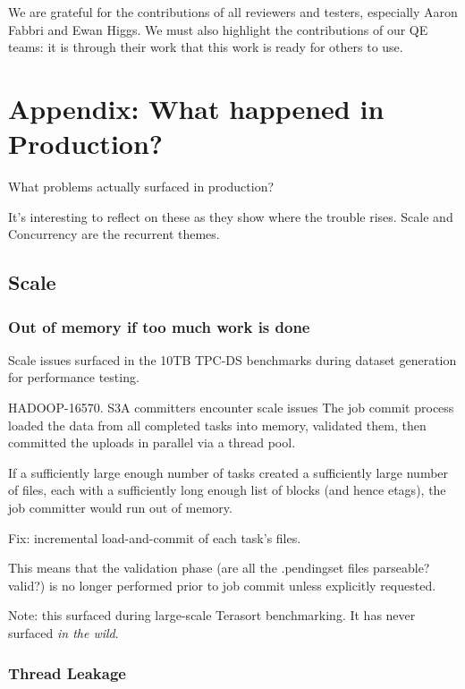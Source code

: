 \documentclass[conference]{IEEEtran}
\begin{document}
We are grateful for the contributions of all reviewers and testers, especially
Aaron Fabbri and Ewan Higgs.
We must also highlight the contributions of our QE teams: it is through
their work that this work is ready for others to use.



\section{Appendix: What happened in Production?}
\label{sec:appendix}


What problems actually surfaced in production?

It's interesting to reflect on these as they show where
the trouble rises.
Scale and Concurrency are the recurrent themes.

\subsection{Scale}
\label{subsec:scale}

\subsubsection{Out of memory if too much work is done}

Scale issues surfaced in the 10TB TPC-DS benchmarks during dataset generation
for performance testing.

HADOOP-16570. S3A committers encounter scale issues
The job commit process loaded the data from all completed tasks into memory,
validated them, then committed the uploads in parallel via a thread pool.

If a sufficiently large enough number of tasks created a sufficiently large
number of files, each with a sufficiently long enough list of blocks
(and hence etags), the job committer would run out of memory.

Fix: incremental load-and-commit of each task's files.

This means that the validation phase
(are all the .pendingset files parseable? valid?) is no longer performed
prior to job commit unless explicitly requested.

Note: this surfaced during large-scale Terasort benchmarking.
It has never surfaced \emph{in the wild}.

\subsubsection{Thread Leakage}
\end{document}
